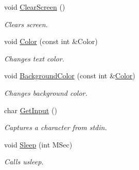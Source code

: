 \begin{DoxyCompactItemize}
void \hyperlink{namespace_chase_game_a3a7382465f6f23fe77cde4e589fb80d6}{Clear\-Screen} ()
\begin{DoxyCompactList}\small\item\em Clears screen. \end{DoxyCompactList}\item 
void \hyperlink{namespace_chase_game_a3a120300b1e200a26fe8680a33300283}{Color} (const int \&Color)
\begin{DoxyCompactList}\small\item\em Changes text color. \end{DoxyCompactList}\item 
void \hyperlink{namespace_chase_game_ad2dbfd93f4fd5725ab396d5dfa78a0c4}{Background\-Color} (const int \&\hyperlink{namespace_chase_game_a3a120300b1e200a26fe8680a33300283}{Color})
\begin{DoxyCompactList}\small\item\em Changes background color. \end{DoxyCompactList}\item 
char \hyperlink{namespace_chase_game_afa8eec677de5433e0e886da19f7e9c4a}{Get\-Input} ()
\begin{DoxyCompactList}\small\item\em Captures a character from stdin. \end{DoxyCompactList}\item 
void \hyperlink{namespace_chase_game_a8ca147721cdfaf96ee1f9c5007c27142}{Sleep} (int M\-Sec)
\begin{DoxyCompactList}\small\item\em Calls usleep. \end{DoxyCompactList}\end{DoxyCompactItemize}
